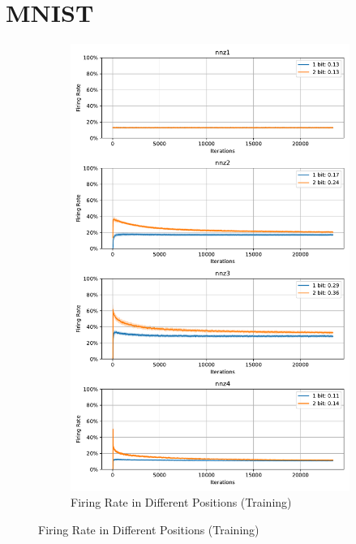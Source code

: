     \section{MNIST}
    \label{appendix:firerate_mnist}
        \begin{figure}[H]
            \centering
            \begin{subfigure}[H]{\textwidth}
                \centering
                \includegraphics[width=\textwidth]{../firerate/MNIST/plots/mnist_train_firerate.pdf}
                \caption{Firing Rate in Different Positions (Training)}
            \end{subfigure}
        \end{figure}
